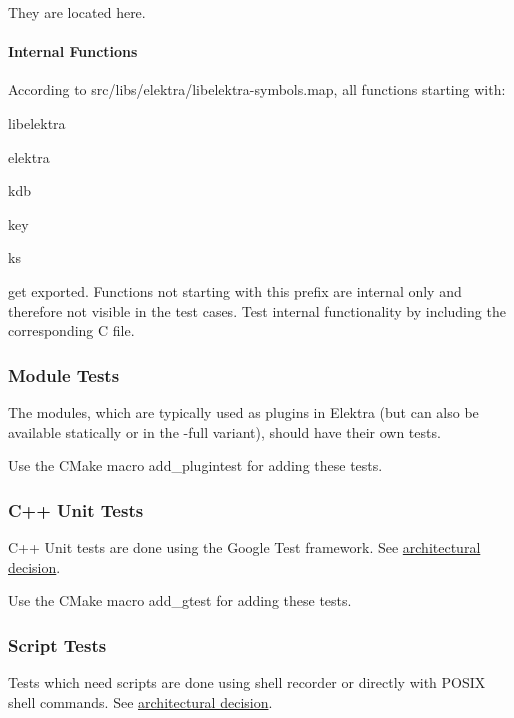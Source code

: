 They are located here.

\paragraph*{Internal Functions}

According to {\ttfamily src/libs/elektra/libelektra-\/symbols.\+map}, all functions starting with\+:


\begin{DoxyItemize}
\item {\ttfamily libelektra}
\item {\ttfamily elektra}
\item {\ttfamily kdb}
\item {\ttfamily key}
\item {\ttfamily ks}
\end{DoxyItemize}

get exported. Functions not starting with this prefix are internal only and therefore not visible in the test cases. Test internal functionality by including the corresponding C file.

\subsubsection*{Module Tests}

The modules, which are typically used as plugins in Elektra (but can also be available statically or in the {\ttfamily -\/full} variant), should have their own tests.

Use the C\+Make macro {\ttfamily add\+\_\+plugintest} for adding these tests.

\subsubsection*{C++ Unit Tests}

C++ Unit tests are done using the Google Test framework. See \hyperlink{doc_decisions_unit_testing_md}{architectural decision}.

Use the C\+Make macro {\ttfamily add\+\_\+gtest} for adding these tests.

\subsubsection*{Script Tests}

Tests which need scripts are done using shell recorder or directly with P\+O\+S\+IX shell commands. See \hyperlink{doc_decisions_script_testing_md}{architectural decision}.

